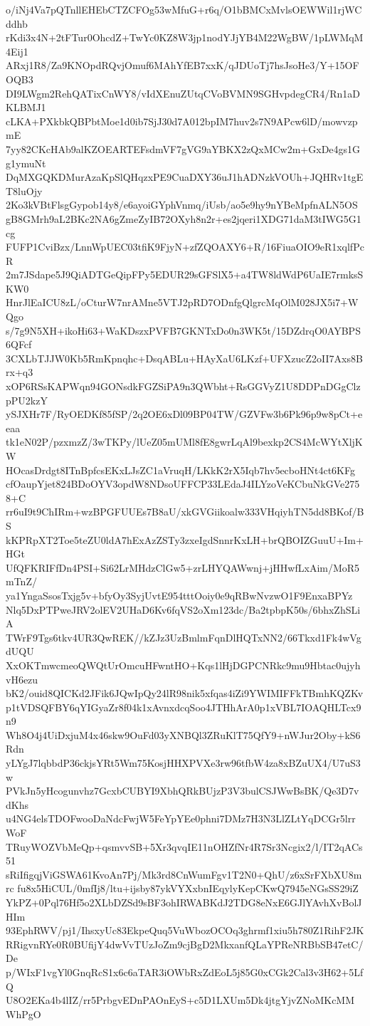 o/iNj4Va7pQTnllEHEbCTZCFOg53wMfuG+r6q/O1bBMCxMvlsOEWWil1rjWCddhb
rKdi3x4N+2tFTur0OhcdZ+TwYc0KZ8W3jp1nodYJjYB4M22WgBW/1pLWMqM4Eij1
ARxj1R8/Za9KNOpdRQvjOmuf6MAhYfEB7xxK/qJDUoTj7hsJsoHe3/Y+15OFOQB3
DI9LWgm2RehQATixCnWY8/vIdXEnuZUtqCVoBVMN9SGHvpdegCR4/Rn1aDKLBMJ1
cLKA+PXkbkQBPbtMoe1d0ib7SjJ30d7A012bpIM7huv2s7N9APcw6lD/mowvzpmE
7yy82CKcHAb9alKZOEARTEFsdmVF7gVG9aYBKX2zQxMCw2m+GxDe4gs1Gg1ymuNt
DqMXGQKDMurAzaKpSlQHqzxPE9CuaDXY36uJ1hADNzkVOUh+JQHRv1tgET8luOjy
2Ko3kVBtFlsgGypob14y8/e6ayoiGYphVnmq/iUsb/ao5e9hy9nYBeMpfnALN5OS
gB8GMrh9aL2BKc2NA6gZmeZyIB72OXyh8n2r+es2jqeri1XDG71daM3tIWG5G1cg
FUFP1CviBzx/LnnWpUEC03tfiK9FjyN+zfZQOAXY6+R/16FiuaOIO9eR1xqlfPcR
2m7JSdape5J9QiADTGeQipFPy5EDUR29sGFSlX5+a4TW8ldWdP6UaIE7rmksSKW0
HnrJlEaICU8zL/oCturW7nrAMne5VTJ2pRD7ODnfgQlgrcMqOlM028JX5i7+WQgo
s/7g9N5XH+ikoHi63+WaKDszxPVFB7GKNTxDo0n3WK5t/15DZdrqO0AYBPS6QFcf
3CXLbTJJW0Kb5RmKpnqhc+DsqABLu+HAyXaU6LKzf+UFXzucZ2oII7Axs8Brx+q3
xOP6RSsKAPWqn94GONsdkFGZSiPA9n3QWbht+RsGGVyZ1U8DDPnDGgClzpPU2kzY
ySJXHr7F/RyOEDKf85fSP/2q2OE6xDl09BP04TW/GZVFw3b6Pk96p9w8pCt+eeaa
tk1eN02P/pzxmzZ/3wTKPy/lUeZ05mUMl8fE8gwrLqAl9bexkp2CS4McWYtXljKW
HOcasDrdgt8ITnBpfcsEKxLJsZC1aVruqH/LKkK2rX5Iqb7hv5ecboHNt4ct6KFg
cfOaupYjet824BDoOYV3opdW8NDsoUFFCP33LEdaJ4ILYzoVeKCbuNkGVe2758+C
rr6uI9t9ChIRm+wzBPGFUUEs7B8aU/xkGVGiikoalw333VHqiyhTN5dd8BKof/BS
kKPRpXT2Toe5teZU0ldA7hExAzZSTy3zxeIgdSnnrKxLH+brQBOIZGuuU+Im+HGt
UfQFKRIFfDn4PSI+Si62LrMHdzClGw5+zrLHYQAWwnj+jHHwfLxAim/MoR5mTnZ/
ya1YngaSsosTxjg5v+bfyOy3SyjUvtE954tttOoiy0e9qRBwNvzwO1F9EnxaBPYz
Nlq5DxPTPweJRV2olEV2UHaD6Kv6fqVS2oXm123dc/Ba2tpbpK50s/6bhxZhSLiA
TWrF9Tgs6tkv4UR3QwREK//kZJz3UzBmlmFqnDlHQTxNN2/66Tkxd1Fk4wVgdUQU
XxOKTmwcmeoQWQtUrOmcuHFwntHO+Kqs1lHjDGPCNRkc9mu9Hbtac0ujyhvH6ezu
bK2/ouid8QICKd2JFik6JQwIpQy24lR98nik5xfqas4iZi9YWIMIFFkTBmhKQZKv
p1tVDSQFBY6qYIGyaZr8f04k1xAvnxdcqSoo4JTHhArA0p1xVBL7IOAQHLTcx9n9
Wh8O4j4UiDxjuM4x46skw9OuFd03yXNBQl3ZRuKlT75QfY9+nWJur2Oby+kS6Rdn
yLYgJ7lqbbdP36ckjsYRt5Wm75KosjHHXPVXe3rw96tfbW4za8xBZuUX4/U7uS3w
PVkJn5yHcogunvhz7GcxbCUBYI9XbhQRkBUjzP3V3bulCSJWwBsBK/Qe3D7vdKhs
u4NG4elsTDOFwooDaNdcFwjW5FeYpYEe0phni7DMz7H3N3LlZLtYqDCGr5lrrWoF
TRuyWOZVbMeQp+qsmvvSB+5Xr3qvqIE11nOHZfNr4R7Sr3Ncgix2/l/IT2qACs51
sRiIfigqjViGSWA61KvoAn7Pj/Mk3rd8CnWumFgv1T2N0+QhU/z6xSrFXbXU8mrc
fu8x5HiCUL/0mfIj8/ltu+ijsby87ykVYXxbnIEqylyKepCKwQ7945eNGsSS29iZ
YkPZ+0Pql76Hf5o2XLbDZSd9sBF3ohIRWABKdJ2TDG8eNxE6GJlYAvhXvBolJHIm
93EphRWV/pj1/IhsxyUc83EkpeQuq5VuWbozOCOq3ghrmf1xiu5h780Z1RihF2JK
RRigvnRYe0R0BUfijY4dwVvTUzJoZm9cjBgD2MkxanfQLaYPReNRBbSB47etC/De
p/WIxF1vgYl0GnqRcS1x6c6aTAR3iOWbRxZdEoL5j85G0xCGk2Cal3v3H62+5LfQ
U8O2EKa4b4lIZ/rr5PrbgvEDnPAOnEyS+c5D1LXUm5Dk4jtgYjvZNoMKcMMWhPgO
